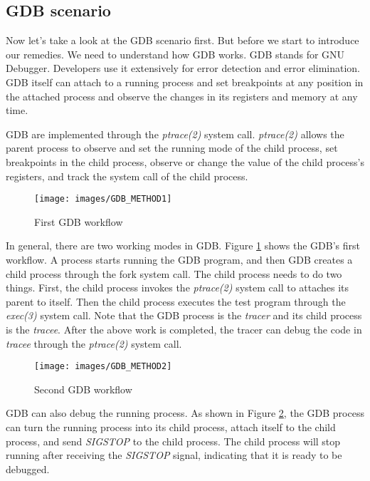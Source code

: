 \subsection{GDB scenario}
Now let's take a look at the GDB scenario first. 
But before we start to introduce our remedies. We need to understand 
how GDB works. GDB stands for GNU Debugger. Developers use it extensively for error 
detection and error elimination. GDB itself can attach to a running 
process and set breakpoints at any position in the attached process 
and observe the changes in its registers and memory at any time. 


GDB are implemented through the \emph{ptrace(2)} system call. 
\emph{ptrace(2)} allows the parent process to observe and set the running mode of 
the child process, set breakpoints in the child process, observe or 
change the value of the child process's registers, and track the system 
call of the child process.

\begin{figure}[tbp]
  \centering
  \texttt{[image: images/GDB\_METHOD1]}
  \caption[Short description]{First GDB workflow}
  \label{fig:GDB_METHOD1}
\end{figure}

In general, there are two working modes in GDB. Figure \ref{fig:GDB_METHOD1} shows 
the GDB's first workflow. A process starts running the GDB program, 
and then GDB creates a child process through the fork system call. 
The child process needs to do two things. First, the child process 
invokes the \emph{ptrace(2)} system call to attaches its parent to itself. 
Then the child process executes the test program through the \emph{exec(3)} 
system call. Note that the GDB process is the \emph{tracer} and its child process 
is the \emph{tracee}. After the above work is completed, the tracer can debug the
code in \emph{tracee} through the \emph{ptrace(2)} system call.


\begin{figure}[tbp]
  \centering
  \texttt{[image: images/GDB\_METHOD2]}
  \caption[Short description]{Second GDB workflow}
  \label{fig:GDB_METHOD2}
\end{figure}

GDB can also debug the running process. As shown in Figure \ref{fig:GDB_METHOD2}, 
the GDB process can turn the running process into its child process, 
attach itself to the child process, and send \emph{SIGSTOP} to the child process. 
The child process will stop running after receiving the \emph{SIGSTOP} signal, 
indicating that it is ready to be debugged.

